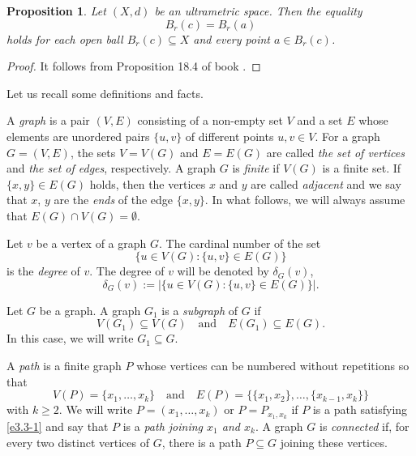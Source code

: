 \documentclass[pdflatex,sn-mathphys-num]{sn-jnl}%
\theoremstyle{thmstyleone}%
\newtheorem{Proposition}[Theorem]{Proposition}
\theoremstyle{thmstyletwo}%
\theoremstyle{thmstylethree}%
\theoremstyle{thmstyletwo}%
\theoremstyle{thmstylethree}%
\begin{document}
\begin{Proposition}\label{typs}
Let $(X,d)$ be an ultrametric space. 
Then the equality
\begin{equation*}
B_r(c) = B_r(a)
\end{equation*}
holds for each open ball \( B_r(c) \subseteq X \) and every point \( a \in B_r(c) \).
\end{Proposition}

\begin{proof} It follows from  Proposition 18.4 of book \cite{Sch1985}. 
\end{proof}



Let us recall some definitions and facts. 


A \textit{graph} is a pair $(V, E)$ consisting of a non-empty set $V$ and a set $E$ whose elements are unordered pairs $\{u, v\}$ of different points $u, v \in V$. For a graph $G = (V, E)$, the sets $V = V(G)$ and $E = E(G)$ are called \textit{the set of vertices} and \textit{the set of edges}, respectively. A graph $G$ is \textit{finite} if $V(G)$ is a finite set. If $\{x, y\} \in E(G)$ holds, then the vertices $x$ and $y$ are called \textit{adjacent} and we say that $x$, $y$ are the {\it ends} of the edge $\{x,y\}$. In what follows, we will always assume that $E(G) \cap V(G) = \emptyset$.



Let $v$ be a vertex of a graph $G$.
The cardinal number of the set
\[
\{u \in V(G) : \{u,v\} \in E(G)\}
\]
is the {\it degree} of $v$. The degree of $v$ will be denoted by $\delta_G(v)$,
\begin{equation}
    \label{zbh0}
\delta_G(v) := \left|\{u \in V(G) : \{u,v\} \in E(G)\}\right|.
\end{equation}






Let $G$ be a graph.
A graph \(G_1\) is a \emph{subgraph} of \(G\) if
\[
V(G_1) \subseteq V(G) \quad \text{and} \quad E(G_1) \subseteq E(G).
\]
In this case, we will write \(G_1 \subseteq G\). 


A \emph{path} is a finite graph \(P\) whose vertices can be numbered without repetitions so that
\begin{equation}\label{e3.3-1}
V(P) = \{x_1, \ldots, x_k\} \quad \text{and} \quad E(P) = \{\{x_1, x_2\}, \ldots, \{x_{k-1}, x_k\}\}
\end{equation}
with \(k \geqslant 2\). We will write \(P = (x_1, \ldots, x_k)\) or \(P = P_{x_1, x_k}\) if \(P\) is a path satisfying \eqref{e3.3-1} and {say} that \(P\) is a \emph{path joining \(x_1\) and \(x_k\)}. A graph \(G\) is \emph{connected} if, for every two distinct vertices of \(G\), there is a path \(P \subseteq G\) joining these vertices.
\end{document}
